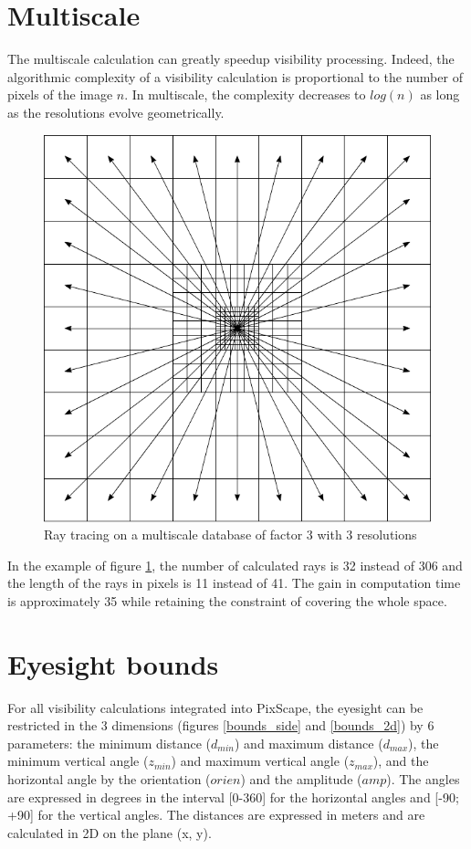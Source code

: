 \documentclass{report}
\begin{document}
\section{Multiscale}
\label{multires}
The multiscale calculation can greatly speedup visibility processing. Indeed, the algorithmic complexity of a visibility calculation is proportional to the number of pixels of the image $n$. In multiscale, the complexity decreases to $log(n)$ as long as the resolutions evolve geometrically.

\begin{figure}[H]
	\includegraphics{img/grid_multi.pdf} 
	\caption{Ray tracing on a multiscale database of factor 3 with 3 resolutions}
	\label{grid_multi}
\end{figure}

In the example of figure \ref{grid_multi}, the number of calculated rays is 32 instead of 306 and the length of the rays in pixels is 11 instead of 41. The gain in computation time is approximately 35 while retaining the constraint of covering the whole space.


\section{Eyesight bounds}
\label{bounds}
For all visibility calculations integrated into PixScape, the eyesight can be restricted in the 3 dimensions (figures \ref{bounds_side} and \ref{bounds_2d}) by 6 parameters: the minimum distance ($d_{min}$) and maximum distance ($d_{max}$), the minimum vertical angle ($z_{min}$) and maximum vertical angle ($z_{max}$), and the horizontal angle by the orientation ($orien$) and the amplitude ($amp$). The angles are expressed in degrees in the interval [0-360] for the horizontal angles and [-90; +90] for the vertical angles. The distances are expressed in meters and are calculated in 2D on the plane (x, y).
\end{document}
